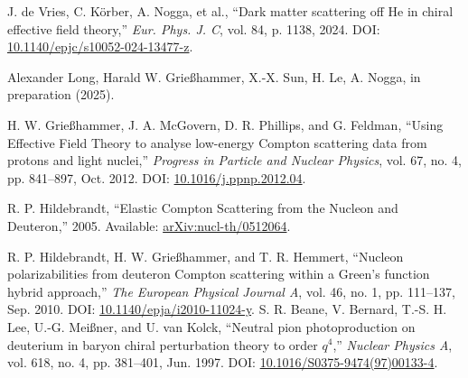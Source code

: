 \documentclass[a4paper,11pt]{article}
\begin{document}
\begin{thebibliography}{99}
J. de Vries, C. Körber, A. Nogga, et al., ``Dark matter scattering
off He in chiral effective field theory,'' \textit{Eur. Phys. J.
C}, vol. 84, p. 1138, 2024. DOI:
\href{https://doi.org/10.1140/epjc/s10052-024-13477-z}{10.1140/epjc/s10052-024-13477-z}.

Alexander Long, Harald W. Grie{\ss}hammer, X.-X. Sun, H. Le, A. Nogga,  in preparation (2025).

H. W. Grie{\ss}hammer, J. A. McGovern, D. R. Phillips, and G. Feldman, ``Using Effective Field Theory to analyse low-energy Compton scattering data from protons and light nuclei,'' \textit{Progress in Particle and Nuclear Physics}, vol. 67, no. 4, pp. 841–897, Oct. 2012. DOI: \href{http://dx.doi.org/10.1016/j.ppnp.2012.04.003}{10.1016/j.ppnp.2012.04}.

R. P. Hildebrandt, ``Elastic Compton Scattering from the Nucleon and Deuteron,'' 2005. Available: \href{https://arxiv.org/abs/nucl-th/0512064}{arXiv:nucl-th/0512064}.

R. P. Hildebrandt, H. W. Grießhammer, and T. R. Hemmert, ``Nucleon polarizabilities from deuteron Compton scattering within a Green’s function hybrid approach,'' \textit{The European Physical Journal A}, vol. 46, no. 1, pp. 111–137, Sep. 2010. DOI: \href{http://dx.doi.org/10.1140/epja/i2010-11024-y}{10.1140/epja/i2010-11024-y}.
S. R. Beane, V. Bernard, T.-S. H. Lee, U.-G. Meißner, and U. van Kolck, ``Neutral pion photoproduction on deuterium in baryon chiral perturbation theory to order $q^4$,'' \textit{Nuclear Physics A}, vol. 618, no. 4, pp. 381–401, Jun. 1997. DOI: \href{http://dx.doi.org/10.1016/S0375-9474(97)00133-4}{10.1016/S0375-9474(97)00133-4}.
\end{thebibliography}
\end{document}
